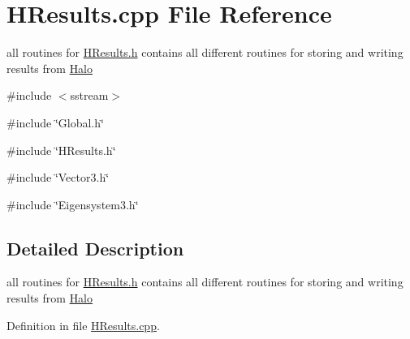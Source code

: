 \section{HResults.cpp File Reference}
\label{HResults_8cpp}


all routines for \hyperlink{HResults_8h}{HResults.h} contains all different routines for storing and writing results from \hyperlink{classHalo}{Halo}  


{\ttfamily \#include $<$sstream$>$}\par
{\ttfamily \#include \char`\"{}Global.h\char`\"{}}\par
{\ttfamily \#include \char`\"{}HResults.h\char`\"{}}\par
{\ttfamily \#include \char`\"{}Vector3.h\char`\"{}}\par
{\ttfamily \#include \char`\"{}Eigensystem3.h\char`\"{}}\par


\subsection{Detailed Description}
all routines for \hyperlink{HResults_8h}{HResults.h} contains all different routines for storing and writing results from \hyperlink{classHalo}{Halo} 

Definition in file \hyperlink{HResults_8cpp_source}{HResults.cpp}.


